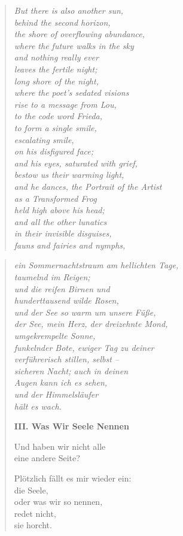 \begin{verse}
\itshape
But there is also another sun,\\
behind the second horizon,\\
the shore of overflowing abundance,\\
where the future walks in the sky\\
and nothing really ever\\
leaves the fertile night;\\
long shore of the night,\\
where the poet's sedated visions\\
rise to a message from Lou,\\
to the code word {\upshape Frieda,}\\
to form a single smile,\\
escalating smile,\\
on his disfigured face;\\
and his eyes, saturated with grief,\\
bestow us their warming light,\\
and he dances, the {\upshape Portrait of the Artist\\
as a Transformed Frog}\\
held high above his head;\\
and all the other lunatics\\
in their invisible disguises,\\
fauns and fairies and nymphs,\\
\end{verse}

\clearpage

\begin{verse}
{\itshape
ein {\upshape Sommernachtstraum} am hellichten Tage,\\
taumelnd im Reigen;\\
und die reifen Birnen und\\
hunderttausend wilde Rosen,\\
und der See so warm um unsere Füße,\\
der See, mein Herz, der dreizehnte Mond,\\
umgekrempelte Sonne,\\
funkelnder Bote, ewiger Tag zu deiner\\
verführerisch stillen, selbst --\\
sicheren Nacht; auch in deinen\\
Augen kann ich es sehen,\\
und der Himmelsläufer\\
hält es wach.}

\vspace*{\onelineskip}
{\bfseries III. Was Wir Seele Nennen}

Und haben wir nicht alle\\
eine andere Seite?

Plötzlich fällt es mir wieder ein:\\
die Seele,\\
oder was wir so nennen,\\
redet nicht,\\
sie horcht.
\end{verse}

